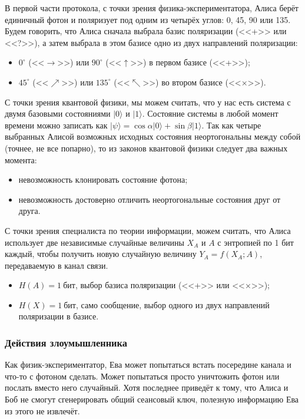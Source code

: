 В первой части протокола, с точки зрения физика-экспериментатора, Алиса берёт единичный фотон и поляризует под одним из четырёх углов: 0, 45, 90 или 135. Будем говорить, что Алиса сначала выбрала базис поляризации (<<+>> или <<?>>), а затем выбрала в этом базисе одно из двух направлений поляризации:

\begin{itemize}
	\item $0^{\circ}$ (<<$\rightarrow$>>) или $90^{\circ}$ (<<$\uparrow$>>) в первом базисе (<<+>>);
	\item $45^{\circ}$ (<<$\nearrow$>>) или $135^{\circ}$ (<<$\nwarrow$>>) во втором базисе (<<×>>).
\end{itemize}

С точки зрения квантовой физики, мы можем считать, что у нас есть система с двумя базовыми состояниями $|0\rangle$ и $|1\rangle$. Состояние системы в любой момент времени можно записать как $| \psi \rangle = \cos \alpha |0\rangle + \sin \beta |1\rangle$. Так как четыре выбранных Алисой возможных исходных состояния неортогональны между собой (точнее, не все попарно), то из законов квантовой физики следует два важных момента:

\begin{itemize}
	\item невозможность клонировать состояние фотона;
	\item невозможность достоверно отличить неортогональные состояния друг от друга.
\end{itemize}

С точки зрения специалиста по теории информации, можем считать, что Алиса использует две независимые случайные величины $X_A$ и $A$ с энтропией по 1 бит каждый, чтобы получить новую случайную величину $Y_A = f \left( X_A; A \right)$, передаваемую в канал связи.

\begin{itemize}
	\item $H \left( A \right) = 1~\text{бит}$, выбор базиса поляризации (<<+>> или <<×>>);
	\item $H \left( X \right) = 1~\text{бит}$, само сообщение, выбор одного из двух направлений поляризации в базисе.
\end{itemize}

\subsubsection{Действия злоумышленника}

Как физик-экспериментатор, Ева может попытаться встать посередине канала и что-то с фотоном сделать. Может попытаться просто уничтожить фотон или послать вместо него случайный. Хотя последнее приведёт к тому, что Алиса и Боб не смогут сгенерировать общий сеансовый ключ, полезную информацию Ева из этого не извлечёт.

